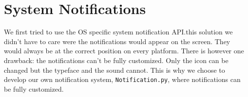 \section{System Notifications}

We first tried to use the OS specific system notification API.\@With this
solution we didn't have to care were the notifications would appear on the
screen. They would always be at the correct position on every platform. There is
however one drawback: the notifications can't be fully customized. Only the icon
can be changed but the typeface and the sound cannot. This is why we choose to
develop our own notification system, \texttt{Notification.py}, where
notifications can be fully customized.
